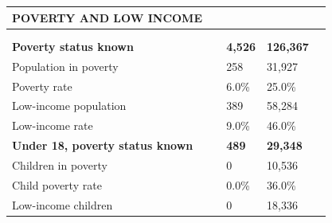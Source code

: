 \documentclass[9pt]{report}
\begin{document}
\vspace{12pt}
\setlength{\tabcolsep}{.01in} %
\begin{tabular}{p{.10in}p{.10in}p{.10in}p{3.7in}>{\hfill}p{.85in}>{\hfill}p{.85in}>{\hfill}p{.85in}>{\hfill}p{.85in}p{0.1in}}
\multicolumn{9}{l}{\parbox{7.1in}{\raggedright{\large{\strut\textbf{POVERTY AND LOW INCOME}\strut}}}} \\ 
\hline
\multicolumn{4}{l}{\parbox{3.5in}{\raggedright{\textbf{}}}} & \multicolumn{1}{r}{\parbox{.85in}{\strut\raggedleft{\textbf{}\strut}}} & \multicolumn{1}{r}{\parbox{.85in}{\strut\raggedleft{\textbf{}\strut}}} & \multicolumn{1}{r}{\parbox{.85in}{\strut{}}} & \multicolumn{1}{r}{\parbox{.85in}{\strut{}}} & \\ 
\multicolumn{9}{l}{} \\ 
\multicolumn{4}{l}{\parbox{3.5in}{\strut\raggedright{\textbf{Poverty status known}\strut}}} & \textbf{} & \textbf{} & \textbf{4,526} & \textbf{126,367} & \textbf{} \\ 
\multicolumn{4}{l}{\parbox{3.6in}{\strut\raggedright{{Population in poverty}}\strut}} &  &  & 258 & 31,927 & \multicolumn{1}{l}{}  \\ 
\multicolumn{4}{l}{\parbox{3.6in}{\strut\raggedright{{Poverty rate}}\strut}} &  &  & 6.0\% & 25.0\% & \multicolumn{1}{l}{}  \\ 
\multicolumn{4}{l}{\parbox{3.6in}{\strut\raggedright{{Low-income population}}\strut}} &  &  & 389 & 58,284 & \multicolumn{1}{l}{}  \\ 
\multicolumn{4}{l}{\parbox{3.6in}{\strut\raggedright{{Low-income rate}}\strut}} &  &  & 9.0\% & 46.0\% & \multicolumn{1}{l}{}  \\ 
\multicolumn{4}{l}{\parbox{3.5in}{\strut\raggedright{\textbf{Under 18, poverty status known}\strut}}} & \textbf{} & \textbf{} & \textbf{489} & \textbf{29,348} & \textbf{} \\ 
\multicolumn{4}{l}{\parbox{3.6in}{\strut\raggedright{{Children in poverty}}\strut}} &  &  & 0 & 10,536 & \multicolumn{1}{l}{}  \\ 
\multicolumn{4}{l}{\parbox{3.6in}{\strut\raggedright{{Child poverty rate}}\strut}} &  &  & 0.0\% & 36.0\% & \multicolumn{1}{l}{}  \\ 
\multicolumn{4}{l}{\parbox{3.6in}{\strut\raggedright{{Low-income children}}\strut}} &  &  & 0 & 18,336 & \multicolumn{1}{l}{}  \\ 

\end{tabular}
\end{document}
